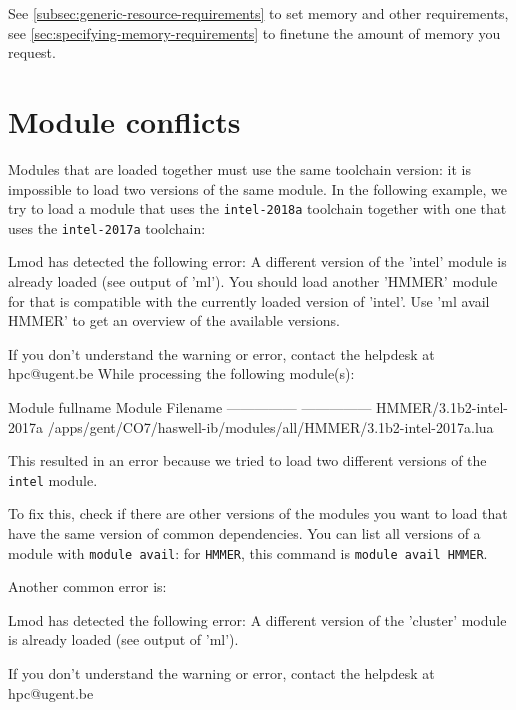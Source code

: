 See \autoref{subsec:generic-resource-requirements} to set memory and other requirements,
see \autoref{sec:specifying-memory-requirements} to finetune the amount of memory you request.

\ifgent

\section{Module conflicts}
\label{sec:module-conflicts}

Modules that are loaded together must use the same toolchain version:
it is impossible to load two versions of the same module. In the following
example, we try to load a module that uses the \lstinline|intel-2018a| toolchain
together with one that uses the \lstinline|intel-2017a| toolchain:

\begin{prompt}
Lmod has detected the following error:  A different version of the 'intel' module is already loaded (see output of 'ml').
You should load another 'HMMER' module for that is compatible with the currently loaded version of 'intel'.
Use 'ml avail HMMER' to get an overview of the available versions.

If you don't understand the warning or error, contact the helpdesk at hpc@ugent.be
While processing the following module(s):

    Module fullname          Module Filename
    ---------------          ---------------
    HMMER/3.1b2-intel-2017a  /apps/gent/CO7/haswell-ib/modules/all/HMMER/3.1b2-intel-2017a.lua
\end{prompt}

This resulted in an error because we tried to load two different versions of the
\lstinline|intel| module.

To fix this, check if there are other versions of the modules you want to load
that have the same version of common dependencies. You can list all versions of
a module with \lstinline|module avail|: for \lstinline|HMMER|, this command is \lstinline|module avail HMMER|.

Another common error is:

\begin{prompt}
Lmod has detected the following error:  A different version of the 'cluster' module is already loaded (see output of 'ml').

If you don't understand the warning or error, contact the helpdesk at hpc@ugent.be
\end{prompt}

